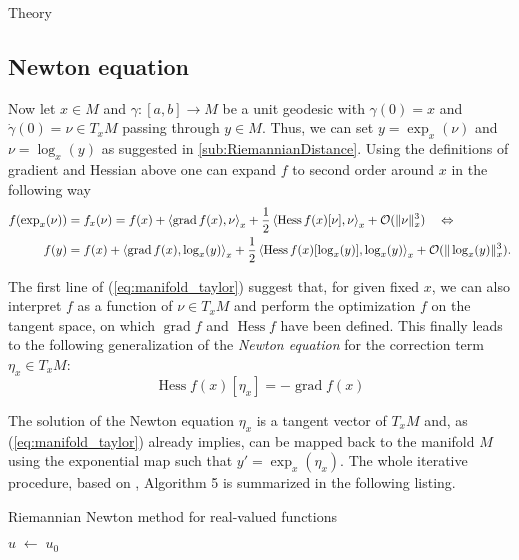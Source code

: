 \begin{chapter}{Theory}
\subsection{Newton equation} %
\label{sub:Newton equation}
Now let $x\in M$ and $\gamma:[a,b] \to M$ be a unit geodesic with $\gamma(0)=x$ and $\dot{\gamma}(0)=\nu\in T_xM$ 
passing through $y\in M$. Thus, we can set $y=\exp_x(\nu)$ and $\nu=\log_x(y)$ as suggested in \ref{sub:RiemannianDistance}. Using the
definitions of gradient and Hessian above one can expand $f$ to second order around $x$ in the following way
\begin{align}
    \label{eq:manifold_taylor}
    f(\exp_x(\nu)) &= f_x(\nu) = f(x) + \left\langle \operatorname{grad}f(x),\nu \right\rangle_x + \frac{1}{2}\left\langle \operatorname{Hess}f(x)[\nu],\nu \right\rangle_x + \mathcal{O}(\| \nu \|_x^3)\quad \Leftrightarrow \\
    f(y) &= f(x) + \left\langle \operatorname{grad}f(x),\log_x(y) \right\rangle_x + \frac{1}{2}\left\langle \operatorname{Hess}f(x)[\log_x(y)],\log_x(y) \right\rangle_x + \mathcal{O}(\| \log_x(y) \|_x^3).\nonumber
\end{align}

The first line of (\ref{eq:manifold_taylor}) suggest that, for given fixed $x$, we can also interpret $f$ as a function of $\nu\in T_xM$ and perform the optimization $f$ on the
tangent space, on which $\operatorname{grad}f$ and $\operatorname{Hess}f$ have been defined. This finally leads to the following generalization of the \emph{Newton equation}
for the correction term $\eta_x \in T_xM$:
\begin{equation}
    \label{eq:newtoneq}
    \operatorname{Hess}f(x)[\eta_x]=-\operatorname{grad}f(x)
\end{equation}

The solution of the Newton equation $\eta_x$ is a tangent vector of $T_xM$ and, as (\ref{eq:manifold_taylor}) already implies, can be mapped back to the manifold $M$ 
using the exponential map such that $y'=\exp_x(\eta_x)$. The whole iterative procedure, based on \cite{AbsilOptim}, Algorithm 5 is summarized in the following listing.
\begin{algorithm}
\caption{Riemannian Newton method for real-valued functions}
\label{al:real_riemannian_newton}
\begin{algorithmic}
    \STATE $u\; \leftarrow\;u_0$
\end{algorithmic}
\end{algorithm}


\end{chapter}
